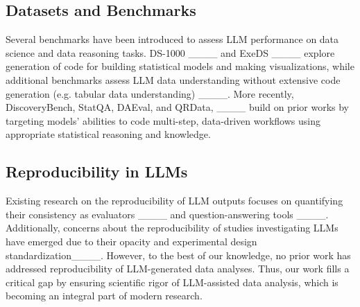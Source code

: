 \subsection{Datasets and Benchmarks}
Several benchmarks have been introduced to assess LLM performance on data science and data reasoning tasks. DS-1000 ____ and ExeDS ____ explore generation of code for building statistical models and making visualizations, 
while additional benchmarks assess LLM data understanding without extensive code generation (e.g. tabular data understanding) ____. 
More recently, DiscoveryBench, StatQA, DAEval, and QRData, ____ build on prior works by targeting models’ abilities to code multi-step, data-driven workflows using appropriate statistical reasoning and knowledge.

\subsection{Reproducibility in LLMs}

Existing research on the reproducibility of LLM outputs focuses on quantifying their consistency as evaluators ____ and question-answering tools ____. Additionally, concerns about the reproducibility of studies investigating LLMs have emerged due to their opacity and experimental design standardization____. However, to the best of our knowledge, no prior work has addressed reproducibility of LLM-generated data analyses. Thus, our work fills a critical gap by ensuring scientific rigor of LLM-assisted data analysis, which is becoming an integral part of modern research.